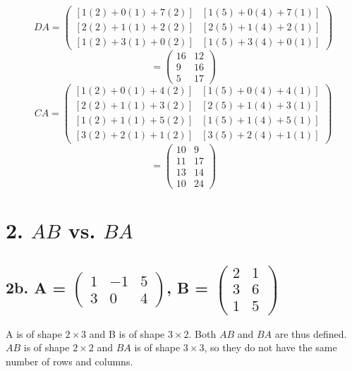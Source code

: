 \documentclass[11pt]{article}
\begin{document}
\[
    DA = \begin{pmatrix}
        [1(2) + 0(1) + 7(2)] & [1(5) + 0(4) + 7(1)] \\
        [2(2) + 1(1) + 2(2)] & [2(5) + 1(4) + 2(1)] \\
        [1(2) + 3(1) + 0(2)] & [1(5) + 3(4) + 0(1)]
    \end{pmatrix}
\]
\[
    = \begin{pmatrix}
        16 & 12 \\
        9 & 16 \\
        5 & 17
    \end{pmatrix}
\]
\[
    CA = \begin{pmatrix}
        [1(2) + 0(1) + 4(2)] & [1(5) + 0(4) + 4(1)] \\
        [2(2) + 1(1) + 3(2)] & [2(5) + 1(4) + 3(1)] \\
        [1(2) + 1(1) + 5(2)] & [1(5) + 1(4) + 5(1)] \\
        [3(2) + 2(1) + 1(2)] & [3(5) + 2(4) + 1(1)]  
    \end{pmatrix}
\]
\[
    = \begin{pmatrix}
        10 & 9 \\
        11 & 17 \\
        13 & 14 \\
        10 & 24
    \end{pmatrix}
\]

\section*{2. \(AB\) vs. \(BA\)}

\subsection*{2b. A = \(
    \begin{pmatrix}
        1 & -1 & 5 \\
        3 & 0 & 4
    \end{pmatrix}
    \), B = \(
        \begin{pmatrix}
            2 & 1 \\
            3 & 6 \\
            1 & 5
        \end{pmatrix}\)}
A is of shape \(2 \times 3\) and B is of shape \(3 \times 2\). Both \(AB\) and \(BA\) are thus defined. \(AB\) is of shape \(2 \times 2\) and \(BA\) is of shape \(3 \times 3\), so they do not have the same number of rows and columns.
\end{document}

